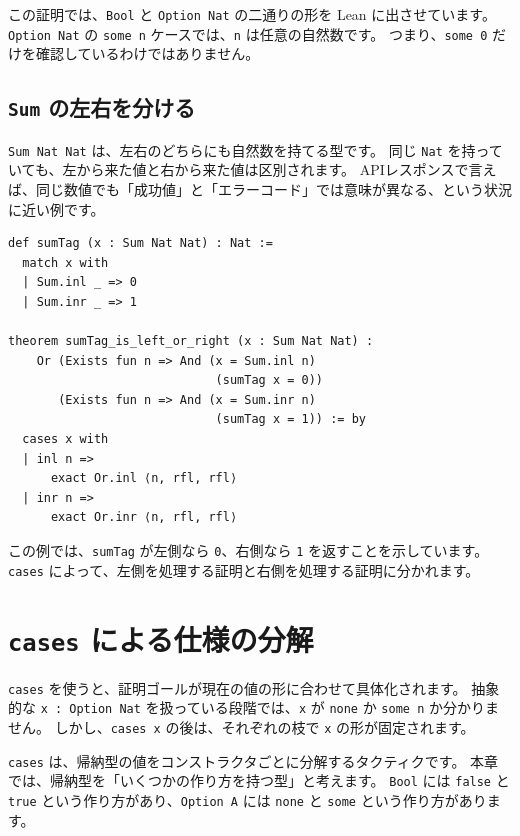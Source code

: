 この証明では、\texttt{Bool} と \texttt{Option Nat} の二通りの形を Lean に出させています。
\texttt{Option Nat} の \texttt{some n} ケースでは、\texttt{n} は任意の自然数です。
つまり、\texttt{some 0} だけを確認しているわけではありません。

\subsection{\texttt{Sum} の左右を分ける}

\texttt{Sum Nat Nat} は、左右のどちらにも自然数を持てる型です。
同じ \texttt{Nat} を持っていても、左から来た値と右から来た値は区別されます。
APIレスポンスで言えば、同じ数値でも「成功値」と「エラーコード」では意味が異なる、という状況に近い例です。

\begin{listing}[htbp]
\begin{verbatim}
def sumTag (x : Sum Nat Nat) : Nat :=
  match x with
  | Sum.inl _ => 0
  | Sum.inr _ => 1

theorem sumTag_is_left_or_right (x : Sum Nat Nat) :
    Or (Exists fun n => And (x = Sum.inl n)
                             (sumTag x = 0))
       (Exists fun n => And (x = Sum.inr n)
                             (sumTag x = 1)) := by
  cases x with
  | inl n =>
      exact Or.inl ⟨n, rfl, rfl⟩
  | inr n =>
      exact Or.inr ⟨n, rfl, rfl⟩
\end{verbatim}
\caption{\texttt{sumTag\_is\_left\_or\_right}}
\label{lst:ch19-sum-cases}
\end{listing}

この例では、\texttt{sumTag} が左側なら \texttt{0}、右側なら \texttt{1} を返すことを示しています。
\texttt{cases} によって、左側を処理する証明と右側を処理する証明に分かれます。

\section{\texttt{cases} による仕様の分解}

\texttt{cases} を使うと、証明ゴールが現在の値の形に合わせて具体化されます。
抽象的な \texttt{x : Option Nat} を扱っている段階では、\texttt{x} が \texttt{none} か \texttt{some n} か分かりません。
しかし、\texttt{cases x} の後は、それぞれの枝で \texttt{x} の形が固定されます。

\texttt{cases} は、帰納型の値をコンストラクタごとに分解するタクティクです。
本章では、帰納型を「いくつかの作り方を持つ型」と考えます。
\texttt{Bool} には \texttt{false} と \texttt{true} という作り方があり、\texttt{Option A} には \texttt{none} と \texttt{some} という作り方があります。

